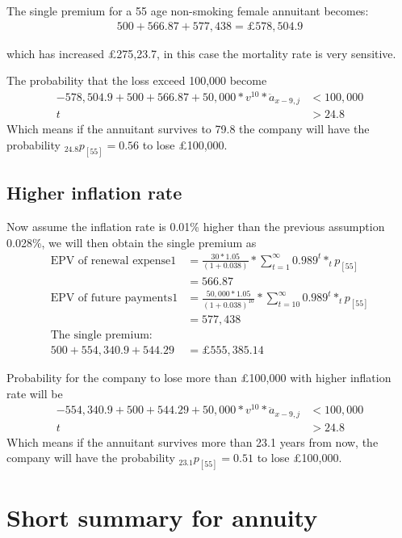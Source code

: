 \documentclass{report}
\begin{document}
The single premium for a 55 age non-smoking female annuitant becomes:
\begin{align}
500+566.87 +577,438 = \pounds578,504.9
\end{align}

which has increased \pounds275,23.7, in this case the mortality rate is very sensitive.

The probability that the loss exceed 100,000 become
 \begin{align*}
-578,504.9 +500+ 566.87 + 50,000*v^{10}*\ddot{a}_{x-9,j}  &< 100,000 \nonumber\\
t &>24.8
\end{align*}
Which means if the annuitant survives to 79.8 the company will have the probability $_{24.8}p_{[55]} = 0.56$ to lose \pounds100,000.


\subsection{Higher inflation rate}

Now assume the inflation rate is 0.01\% higher than the previous assumption 0.028\%, we will then obtain the single premium as 
\begin{align}
        \text{EPV of renewal expense1}
         &= \frac{30*1.05}{(1+0.038)} * \sum_{t=1}^{\infty} 0.989^t * _tp_{[55]} \nonumber\\
         &= 566.87\nonumber\\
        \text{EPV of future payments1} &= \frac{50,000*1.05}{(1+0.038)^{10}} * \sum_{t=10}^{\infty} 0.989^t * _tp_{[55]} \nonumber\\ 
         &=577,438 \nonumber\\
\text{The single premium: } \nonumber\\
500 + 554,340.9 + 544.29 &= \pounds 555,385.14 \nonumber
\end{align}

Probability for the company to lose more than \pounds100,000 with higher inflation rate will be
 \begin{align*}
- 554,340.9 +500 + 544.29 + 50,000*v^{10}*\ddot{a}_{x-9,j}  &< 100,000 \nonumber\\
t &>24.8
\end{align*}
Which means if the annuitant survives more than 23.1 years from now, the company will have the probability $_{23.1}p_{[55]} = 0.51$ to lose \pounds100,000.

\section{Short summary for annuity}
\end{document}
